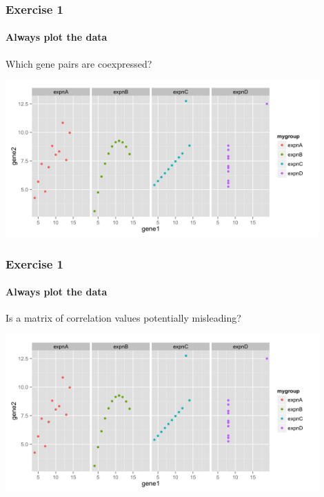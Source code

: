 \begin{frame}
  \frametitle{Exercise 1}
  \framesubtitle{Always plot the data}
    Which gene pairs are coexpressed?
  \begin{center}
    \includegraphics[width=0.9\textwidth]{images/ex1_rplot} \\
  \end{center}
\end{frame}

\begin{frame}
  \frametitle{Exercise 1}
  \framesubtitle{Always plot the data}
    Is a matrix of correlation values potentially misleading?
  \begin{center}
    \includegraphics[width=0.9\textwidth]{images/ex1_rplot} \\
  \end{center}
\end{frame}
